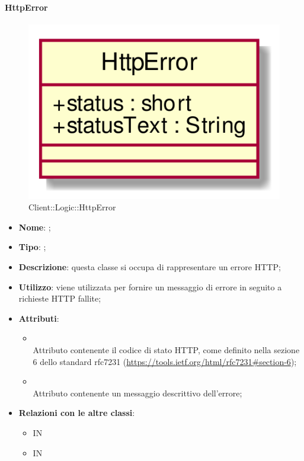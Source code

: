 \hypertarget{HttpError_label}{\paragraph{HttpError}}
\begin{figure}[h]
	\centering
	\includegraphics[width=\textwidth,height=\textheight,keepaspectratio]{images/ClassHttpError.png}
	\caption{Client::Logic::HttpError}
\end{figure}
\begin{itemize}
	\item \textbf{Nome}: ;
	\item \textbf{Tipo}: ;
	\item \textbf{Descrizione}: questa classe si occupa di rappresentare un errore HTTP;
	\item \textbf{Utilizzo}: viene utilizzata per fornire un messaggio di errore in seguito a richieste HTTP fallite;
	\item \textbf{Attributi}:
	\begin{itemize}
		\item[]  \\
		Attributo contenente il codice di stato HTTP, come definito nella sezione 6 dello standard rfc7231 (\url{https://tools.ietf.org/html/rfc7231#section-6});
		\item[]  \\
		Attributo contenente un messaggio descrittivo dell'errore;
	\end{itemize}
	\item \textbf{Relazioni con le altre classi}:
	\begin{itemize}
		\item IN \hyperlink{HttpPromise_label}{}
		\item IN \hyperlink{Logic_label}{}
	\end{itemize}
\end{itemize}
\FloatBarrier

